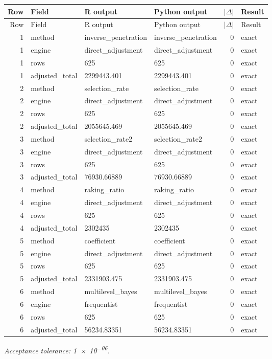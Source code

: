 \documentclass[10pt]{article}
\begin{document}
\small
\begin{longtable}{@{}r p{}p{}p{}rl@{}}
\toprule
Row & Field & R output & Python output & $|\Delta|$ & Result \\
\midrule
\endfirsthead
\toprule
Row & Field & R output & Python output & $|\Delta|$ & Result \\
\midrule
\endhead
1 & method & inverse\_\allowbreak{}penetration & inverse\_\allowbreak{}penetration & 0 & exact \\
1 & engine & direct\_\allowbreak{}adjustment & direct\_\allowbreak{}adjustment & 0 & exact \\
1 & rows & 625 & 625 & 0 & exact \\
1 & adjusted\_\allowbreak{}total & 2299443.401 & 2299443.401 & 0 & exact \\
2 & method & selection\_\allowbreak{}rate & selection\_\allowbreak{}rate & 0 & exact \\
2 & engine & direct\_\allowbreak{}adjustment & direct\_\allowbreak{}adjustment & 0 & exact \\
2 & rows & 625 & 625 & 0 & exact \\
2 & adjusted\_\allowbreak{}total & 2055645.469 & 2055645.469 & 0 & exact \\
3 & method & selection\_\allowbreak{}rate2 & selection\_\allowbreak{}rate2 & 0 & exact \\
3 & engine & direct\_\allowbreak{}adjustment & direct\_\allowbreak{}adjustment & 0 & exact \\
3 & rows & 625 & 625 & 0 & exact \\
3 & adjusted\_\allowbreak{}total & 76930.66889 & 76930.66889 & 0 & exact \\
4 & method & raking\_\allowbreak{}ratio & raking\_\allowbreak{}ratio & 0 & exact \\
4 & engine & direct\_\allowbreak{}adjustment & direct\_\allowbreak{}adjustment & 0 & exact \\
4 & rows & 625 & 625 & 0 & exact \\
4 & adjusted\_\allowbreak{}total & 2302435 & 2302435 & 0 & exact \\
5 & method & coefficient & coefficient & 0 & exact \\
5 & engine & direct\_\allowbreak{}adjustment & direct\_\allowbreak{}adjustment & 0 & exact \\
5 & rows & 625 & 625 & 0 & exact \\
5 & adjusted\_\allowbreak{}total & 2331903.475 & 2331903.475 & 0 & exact \\
6 & method & multilevel\_\allowbreak{}bayes & multilevel\_\allowbreak{}bayes & 0 & exact \\
6 & engine & frequentist & frequentist & 0 & exact \\
6 & rows & 625 & 625 & 0 & exact \\
6 & adjusted\_\allowbreak{}total & 56234.83351 & 56234.83351 & 0 & exact \\
\bottomrule
\end{longtable}
\normalsize
\textit{Acceptance tolerance: \num{1e-06}.}
\end{document}
